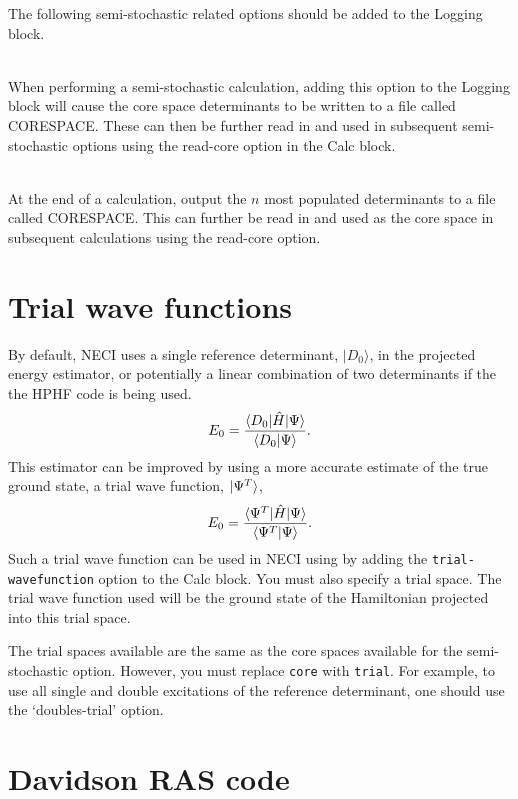\documentclass[a4paper,notitlepage]{scrreprt}
\newcommand\codeitem[1]{\needspace{1.5\baselineskip}\item[\textnormal{\ttfamily #1 \nopagebreak}] \hfill \\ \nopagebreak}
\let\code\lstinline
\begin{document}
    The following semi-stochastic related options should be added to the
    Logging block.
    \begin{description}
		\codeitem{write-core}
            When performing a semi-stochastic calculation, adding this option
            to the Logging block will cause the core space determinants to be
            written to a file called CORESPACE. These can then be further read
            in and used in subsequent semi-stochastic options using the
            read-core option in the Calc block.
		\codeitem{write-most-pop-core-end $n$}
            At the end of a calculation, output the $n$ most populated
            determinants to a file called CORESPACE. This can further be read
            in and used as the core space in subsequent calculations using the
            read-core option.
    \end{description}

\section{Trial wave functions}

    By default, NECI uses a single reference determinant, $|D_0\rangle$, in the
    projected energy estimator, or potentially a linear combination of two 
    determinants if the the HPHF code is being used.
    \begin{equation}
        E_0 = \frac{\braket{D_0 | \hat{H} | \Psi}}{\braket{D_0 | \Psi}}.
    \end{equation}
    This estimator can be improved by using a more accurate estimate of the
    true ground state, a trial wave function, $\ket{\Psi^T}$,
    \begin{equation}
        E_0 = \frac{\braket{\Psi^T | \hat{H} | \Psi}}{\braket{\Psi^T | \Psi}}.
    \end{equation}
    Such a trial wave function can be used in NECI using by adding the
    \code{trial-wavefunction} option to the Calc block.
    You must also specify a
    trial space. The trial wave function used will be the ground state of the
    Hamiltonian projected into this trial space.

    The trial spaces available are the same as the core spaces available for
    the semi-stochastic option. However, you must replace \code{core} with
    \code{trial}. For
    example, to use all single and double excitations of the reference
    determinant, one should use the `doubles-trial' option.

\section{Davidson RAS code}
\end{document}
